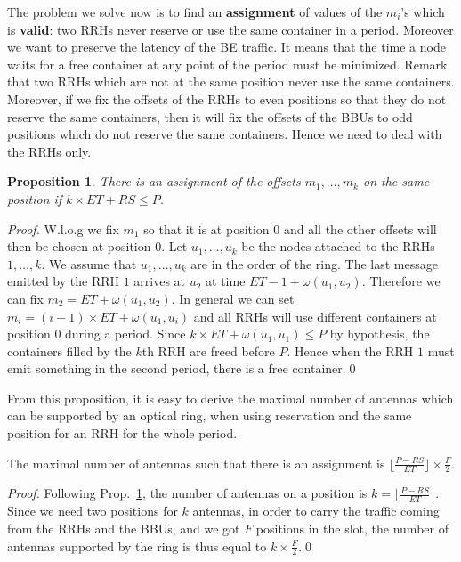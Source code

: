 \documentclass[]{llncs}
\newtheorem{prop}{Proposition}
\begin{document}
The problem we solve now is to find an \textbf{assignment} of values of the $m_i$'s which is \textbf{valid}: two RRHs never reserve or use the same container in a period. Moreover we want to preserve the latency of the BE traffic. It means that the time a node waits for a free container at any point of the period must be minimized. 
Remark that two RRHs which are not at the same position never use the same containers. Moreover, if we fix the offsets of the RRHs to even positions so that they do not reserve the same containers, then it will fix the offsets of the BBUs to odd positions which do not reserve the same containers. Hence we need to deal with the RRHs only.


\begin{prop}
\label{prop:assign}
There is an assignment of the offsets $m_1, \dots, m_k$ on the same position if  $k\times ET + RS \leq P$.
\end{prop}
\begin{proof}
 W.l.o.g we fix $m_1$ so that it is at position $0$ and all the other offsets will then be chosen at position $0$. 
 Let $u_1,\dots,u_k$ be the nodes attached to the RRHs $1,\dots,k$. We assume that $u_1,\dots,u_k$ are in the order of the ring. The last message emitted by the RRH $1$ arrives at $u_2$ at time $ET - 1 + \omega(u_1,u_2)$. Therefore we can fix $m_2 =  ET  + \omega(u_1,u_2)$. In general we can set $m_i = (i-1) \times ET + \omega(u_1,u_i)$ and all RRHs will use different containers at position $0$ during a period. Since $k \times ET + \omega(u_1,u_1) \leq P$ by hypothesis,
 the containers filled by the $k$th RRH are freed before $P$. Hence when the RRH $1$ must emit something in the second period, there is a free container.\qed
\end{proof}

From this proposition, it is easy to derive the maximal number of antennas which can be supported by an optical ring,
when using reservation and the same position for an RRH for the whole period.

\begin{corollary}
The maximal number of antennas such that there is an assignment is $ \lfloor\frac{P- RS}{ET}\rfloor \times \frac{F}{2}$.
\end{corollary}
\begin{proof}
Following Prop.~\ref{prop:assign}, the number of antennas on a position is $k = \lfloor\frac{P- RS}{ET}\rfloor $.
Since we need two positions for $k$ antennas, in order to carry the traffic coming from the RRHs and the BBUs, and we got $F$ positions in the slot, the number of antennas supported by the ring is thus equal to $k \times \frac{F}{2}$.\qed
\end{proof}
\end{document}
